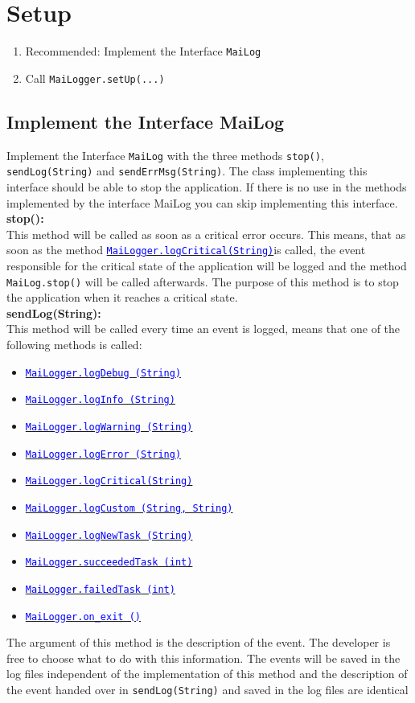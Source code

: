 \documentclass{article}
\newcommand{\refh}[2]{\hyperref[#1] {\textcolor{blue}{#2}}}
\newcommand{\logDebug}{\refh{logging_debug}{\lstinline|MaiLogger.logDebug (String)|}}
\newcommand{\logInfo}{\refh{logging_info}{\lstinline|MaiLogger.logInfo (String)|}}
\newcommand{\logWarning}{\refh{logging_warning}{\lstinline|MaiLogger.logWarning (String)|}}
\newcommand{\logError}{\refh{logging_error}{\lstinline|MaiLogger.logError (String)|}}
\newcommand{\logCritical}{\refh{logging_critical}{\lstinline|MaiLogger.logCritical(String)|}}
\newcommand{\logCustom}{\refh{logging_custom}{\lstinline|MaiLogger.logCustom (String, String)|}}
\newcommand{\logTask}{\refh{tasks_logTask}{\lstinline|MaiLogger.logNewTask (String)|}}
\newcommand{\succeededTask}{\refh{tasks_succeededTask}{\lstinline|MaiLogger.succeededTask (int)|}}
\newcommand{\failedTask}{\refh{tasks_failedTask}{\lstinline|MaiLogger.failedTask (int)|}}
\newcommand{\onExit}{\refh{on_exit}{\lstinline|MaiLogger.on_exit ()|}}
\begin{document}
\pagebreak
\section{Setup}
\label{setup}
    \begin{enumerate}
        \item Recommended: Implement the Interface \lstinline|MaiLog|
        \item Call \lstinline|MaiLogger.setUp(...)|
    \end{enumerate}

    \subsection{Implement the Interface MaiLog}
    \label{setup_interface}
    Implement the Interface \lstinline|MaiLog| with the three methods \lstinline|stop()|, \lstinline|sendLog(String)| and \lstinline|sendErrMsg(String)|.
    The class implementing this interface should be able to stop the application.
    If there is no use in the methods implemented by the interface MaiLog you can skip implementing this interface. \\

    \textbf{stop():} \\
    This method will be called as soon as a critical error occurs.
    This means, that as soon as the method \logCritical is called, the event responsible for the critical state of the application will be logged and the method \lstinline|MaiLog.stop()| will be called afterwards.
    The purpose of this method is to stop the application when it reaches a critical state. \\

    \textbf{sendLog(String):} \\
    This method will be called every time an event is logged, means that one of the following methods is called:
    \begin{itemize}
    	\item \logDebug
        \item \logInfo
        \item \logWarning
        \item \logError
        \item \logCritical
        \item \logCustom
        \item \logTask
        \item \succeededTask
        \item \failedTask
        \item \onExit
    \end{itemize}
    The argument of this method is the description of the event.
    The developer is free to choose what to do with this information.
    The events will be saved in the log files independent of the implementation of this method and the description of the event handed over in \lstinline|sendLog(String)| and saved in the log files are identical \\
\end{document}
